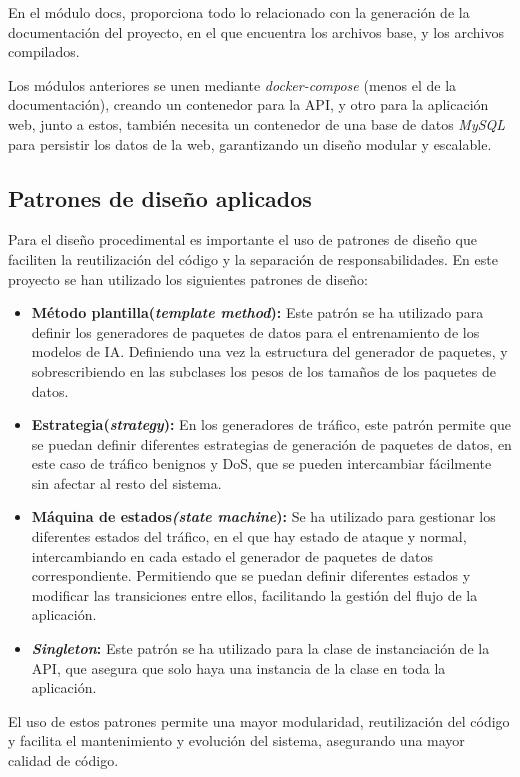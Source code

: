 En el módulo docs, proporciona todo lo relacionado con la generación de la documentación del proyecto, en el que encuentra los archivos base, y los archivos compilados.

Los módulos anteriores se unen mediante \textit{docker-compose} (menos el de la documentación), creando un contenedor para la API, y otro para la aplicación web, junto a estos, también necesita un contenedor de una base de datos \textit{MySQL} para persistir los datos de la web, garantizando un diseño modular y escalable.


\subsection{Patrones de diseño aplicados}
Para el diseño procedimental es importante el uso de patrones de diseño que faciliten la reutilización del código y la separación de responsabilidades. En este proyecto se han utilizado los siguientes patrones de diseño:
\begin{itemize}
    \item \textbf{Método plantilla(\textit{template method}): } Este patrón se ha utilizado para definir los generadores de paquetes de datos para el entrenamiento de los modelos de IA. Definiendo una vez la estructura del generador de paquetes, y sobrescribiendo en las subclases los pesos de los tamaños de los paquetes de datos.
    \item \textbf{Estrategia(\textit{strategy}): } En los generadores de tráfico, este patrón permite que se puedan definir diferentes estrategias de generación de paquetes de datos, en este caso de tráfico benignos y DoS, que se pueden intercambiar fácilmente sin afectar al resto del sistema.
    \item \textbf{Máquina de estados\textit{(state machine}): } Se ha utilizado para gestionar los diferentes estados del tráfico, en el que hay estado de ataque y normal, intercambiando en cada estado el generador de paquetes de datos correspondiente. Permitiendo que se puedan definir diferentes estados y modificar las transiciones entre ellos, facilitando la gestión del flujo de la aplicación.
    \item \textbf{\textit{Singleton}: } Este patrón se ha utilizado para la clase de instanciación de la API, que asegura que solo haya una instancia de la clase en toda la aplicación.
\end{itemize}
El uso de estos patrones permite una mayor modularidad, reutilización del código y facilita el mantenimiento y evolución del sistema, asegurando una mayor calidad de código.